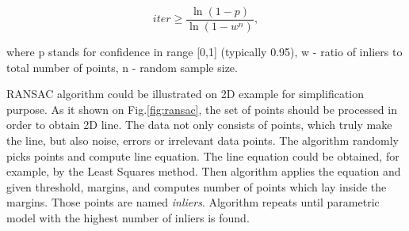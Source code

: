 \documentclass{ctuthesis}
\begin{document}
\[ iter \geq \frac{\ln{(1 - p)}}{\ln{(1 - w^n)}}, \]

where p stands for confidence in range [0,1] (typically 0.95), w - ratio of inliers to total number of points, n - random sample size.

RANSAC algorithm could be illustrated on 2D example for simplification purpose. As it shown on Fig.\ref{fig:ransac}, the set of points should be processed in order to obtain 2D line. The data not only consists of points, which truly make the line, but also noise, errors or irrelevant data points. The algorithm randomly picks points and compute line equation. The line equation could be obtained, for example, by the Least Squares method. Then algorithm applies the equation and given threshold, margins, and computes number of points which lay inside the margins. Those points are named \emph{inliers}. Algorithm repeats until parametric model with the highest number of inliers is found.
\end{document}
